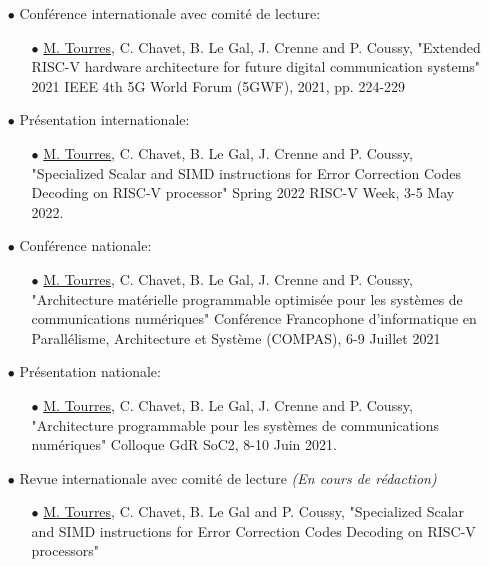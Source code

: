 \documentclass[../main.tex]{subfiles}
\begin{document}
\begin{itemize}
    \item[$\bullet$] Conférence internationale avec comité de lecture:
    
    \begin{itemize}
        \item[$\bullet$]  \underline{M. Tourres}, C. Chavet, B. Le Gal, J. Crenne and P. Coussy, "Extended RISC-V hardware architecture for future digital communication systems" 2021 IEEE 4th 5G World Forum (5GWF), 2021, pp. 224-229
    \end{itemize}

    \item[$\bullet$] Présentation internationale:
    
    \begin{itemize}
        \item[$\bullet$] \underline{M. Tourres}, C. Chavet, B. Le Gal, J. Crenne and P. Coussy, "Specialized Scalar and SIMD instructions for Error Correction Codes Decoding on RISC-V processor" Spring 2022 RISC-V Week, 3-5 May 2022.
    \end{itemize}
    
    \item[$\bullet$] Conférence nationale:
    
    \begin{itemize}
        \item[$\bullet$] \underline{M. Tourres}, C. Chavet, B. Le Gal, J. Crenne and P. Coussy, "Architecture matérielle programmable optimisée pour les systèmes de communications numériques" Conférence Francophone d’informatique en Parallélisme, Architecture et Système (COMPAS), 6-9 Juillet 2021 
    \end{itemize}
    
    \item[$\bullet$] Présentation nationale:
    
    \begin{itemize}
        \item[$\bullet$] \underline{M. Tourres}, C. Chavet, B. Le Gal, J. Crenne and P. Coussy, "Architecture programmable pour les systèmes de communications numériques" Colloque GdR SoC2, 8-10 Juin 2021.
    \end{itemize}

    \item[$\bullet$] Revue internationale avec comité de lecture \textit{(En cours de rédaction)}
    \begin{itemize}
        \item[$\bullet$] \underline{M. Tourres}, C. Chavet, B. Le Gal and P. Coussy, "Specialized Scalar and SIMD instructions for Error Correction Codes Decoding on RISC-V processors" 
    \end{itemize}
    
\end{itemize}
\end{document}
